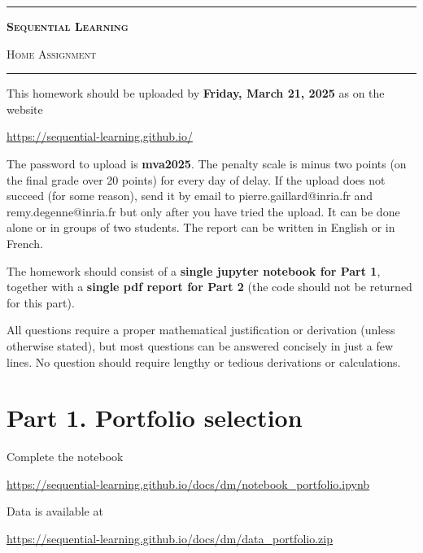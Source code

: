 \documentclass[11pt]{exam}
\makeatletter
\newcommand{\thiscoursecode}{Sequential Learning}
\newcommand{\examname}{Home Assignment}
\newcommand{\email}{pierre.gaillard@inria.fr}
\newcommand{\emailremy}{remy.degenne@inria.fr}
\newcommand{\notefront}{
\begin{center}

\hrule \vspace*{20pt}
\textbf{\huge{\textsc{\thiscoursecode}}}{\huge \par} 

\smallskip
{\large{\textsc{\examname}}}\\ \vspace{20pt}

\hrule \vspace*{20pt}

  \end{center}
  }
\makeatother
\begin{document}
  \notefront


This homework should be uploaded by {\bfseries Friday, March 21, 2025} as on the website
\begin{center}
	\url{https://sequential-learning.github.io/}
\end{center}
The password to upload is {\bfseries mva2025}. The penalty scale is minus two points (on the final grade over 20 points) for every day of delay. If the upload does not succeed (for some reason), send it by email to \email{} and \emailremy{} but only after you have tried the upload. It can be done alone or in groups of two students. The report can be written in English or in French.

\medskip
The homework should consist of a {\bfseries single jupyter notebook for Part 1}, together with  a {\bfseries single pdf report for Part 2} (the code should not be returned for this part). 

 

\medskip
All questions require a proper mathematical justification or derivation (unless otherwise stated), but most questions can be answered concisely in just a few lines. No question should require lengthy or tedious derivations or calculations.



\section*{Part 1. Portfolio selection}

Complete the notebook 
\begin{center}
	\url{https://sequential-learning.github.io/docs/dm/notebook_portfolio.ipynb}
\end{center}
Data is available at
\begin{center}
	\url{https://sequential-learning.github.io/docs/dm/data_portfolio.zip}
\end{center}



\end{document}
